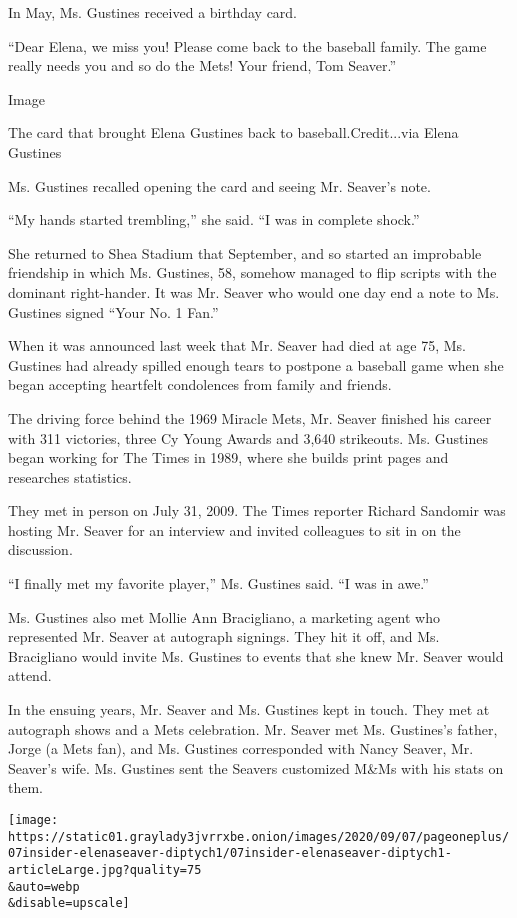 In May, Ms. Gustines received a birthday card.

``Dear Elena, we miss you! Please come back to the baseball family. The
game really needs you and so do the Mets! Your friend, Tom Seaver.''

Image

The card that brought Elena Gustines back to baseball.Credit...via Elena
Gustines

Ms. Gustines recalled opening the card and seeing Mr. Seaver's note.

``My hands started trembling,'' she said. ``I was in complete shock.''

She returned to Shea Stadium that September, and so started an
improbable friendship in which Ms. Gustines, 58, somehow managed to flip
scripts with the dominant right-hander. It was Mr. Seaver who would one
day end a note to Ms. Gustines signed ``Your No. 1 Fan.''

When it was announced last week that Mr. Seaver had died at age 75, Ms.
Gustines had already spilled enough tears to postpone a baseball game
when she began accepting heartfelt condolences from family and friends.

The driving force behind the 1969 Miracle Mets, Mr. Seaver finished his
career with 311 victories, three Cy Young Awards and 3,640 strikeouts.
Ms. Gustines began working for The Times in 1989, where she builds print
pages and researches statistics.

They met in person on July 31, 2009. The Times reporter Richard Sandomir
was hosting Mr. Seaver for an interview and invited colleagues to sit in
on the discussion.

``I finally met my favorite player,'' Ms. Gustines said. ``I was in
awe.''

Ms. Gustines also met Mollie Ann Bracigliano, a marketing agent who
represented Mr. Seaver at autograph signings. They hit it off, and Ms.
Bracigliano would invite Ms. Gustines to events that she knew Mr. Seaver
would attend.

In the ensuing years, Mr. Seaver and Ms. Gustines kept in touch. They
met at autograph shows and a Mets celebration. Mr. Seaver met Ms.
Gustines's father, Jorge (a Mets fan), and Ms. Gustines corresponded
with Nancy Seaver, Mr. Seaver's wife. Ms. Gustines sent the Seavers
customized M\&Ms with his stats on them.

\texttt{[image: https://static01.graylady3jvrrxbe.onion/images/2020/09/07/pageoneplus/07insider-elenaseaver-diptych1/07insider-elenaseaver-diptych1-articleLarge.jpg?quality=75\\\&auto=webp\\\&disable=upscale]}

